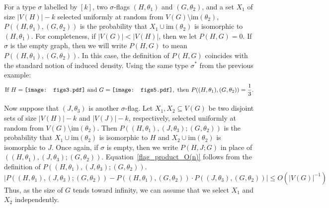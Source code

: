 \documentclass[12pt]{article}
\newcommand{\im}{\text{im}}
\newcommand{\vc}[1]{\ensuremath{\vcenter{\hbox{#1}}}}
\newcommand{\ftrc}{\vc{\texttt{[image: figs3.pdf]}}}
\newcommand{\ffiveone}{\vc{\texttt{[image: figs5.pdf]}}}
\begin{document}
For a type $\sigma$ labelled by $[k]$, two $\sigma$-flags $(H,\theta_1)$ and $(G,\theta_2)$, and a set $X_1$ of size $|V(H)| - k$ selected uniformly at random from $V(G) \setminus \im(\theta_2)$, $P((H,\theta_1),(G,\theta_2))$ is the probability that $X_1 \cup \im(\theta_2)$ is isomorphic to $(H,\theta_1)$.  For completeness, if $|V(G)| < |V(H)|$, then we let $P(H,G) = 0$. If $\sigma$ is the empty graph, then we will write $P(H,G)$ to mean $P((H,\theta_1),(G,\theta_2))$. In this case, the definition of $P(H,G)$ coincides with the standard notion of induced density. Using the same type $\sigma^*$ from the previous example:
\[ \text{If } H = \ftrc \text{ and } G = \ffiveone, \text{ then } P((H,\theta_1),(G,\theta_2)) = \frac{1}{3}.\]

Now suppose that $(J,\theta_3)$ is another $\sigma$-flag. Let $X_1,X_2 \subseteq V(G)$ be two disjoint sets of size $|V(H)| - k$ and $|V(J)| - k$, respectively, selected uniformly at random from $V(G)\setminus \im(\theta_2)$. Then $P((H,\theta_1),(J,\theta_3);(G,\theta_2))$ is the probability that $X_1 \cup \im(\theta_2)$ is isomorphic to $H$ and $X_2 \cup \im(\theta_2)$ is isomorphic to $J$. Once again, if $\sigma$ is empty, then we write $P(H,J;G)$ in place of $((H,\theta_1),(J,\theta_3);(G,\theta_2))$. Equation~\ref{flag_product_O(n)} follows from the definition of $P((H,\theta_1),(J,\theta_3);(G,\theta_2))$.
\begin{equation}\label{flag_product_O(n)}
|P((H,\theta_1),(J,\theta_3);(G,\theta_2)) - P((H,\theta_1),(G,\theta_2))\cdot P((J,\theta_3),(G,\theta_2))| \leq O(|V(G)|^{-1})
\end{equation}
Thus, as the size of $G$ tends toward infinity, we can assume that we select $X_1$ and $X_2$ independently.
\end{document}
